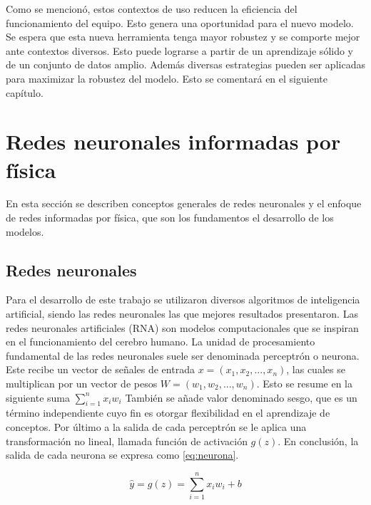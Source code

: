 Como se mencionó, estos contextos de uso reducen la eficiencia del funcionamiento del equipo. Esto genera una oportunidad para el nuevo modelo. Se espera que esta nueva herramienta tenga mayor robustez y se comporte mejor ante contextos diversos. Esto puede lograrse a partir de un aprendizaje sólido y de un conjunto de datos amplio. Además diversas estrategias pueden ser aplicadas para maximizar la robustez del modelo. Esto se comentará en el siguiente capítulo.

\section{Redes neuronales informadas por física}
En esta sección se describen conceptos generales de redes neuronales y el enfoque de redes informadas por física, que son los fundamentos el desarrollo de los modelos.

\newenvironment{conditions}
{\par\vspace{\abovedisplayskip}\noindent\begin{tabular}{>{$}l<{$} @{${}={}$} l}}
	{\end{tabular}\par\vspace{\belowdisplayskip}}

\subsection{Redes neuronales}
Para el desarrollo de este trabajo se utilizaron diversos algoritmos de inteligencia artificial, siendo las redes neuronales las que mejores resultados presentaron. 
Las redes neuronales artificiales (RNA) son modelos computacionales que se inspiran en el funcionamiento del cerebro humano. La unidad de procesamiento fundamental de las redes neuronales suele ser denominada perceptrón o neurona.  Este recibe un vector de señales de entrada $ x =(x_1, x_2, . . . , x_n) $, las cuales se multiplican por un vector de pesos $W = (w_1, w_2, . . . , w_n)$. Esto se resume en la siguiente suma $\sum_{i=1}^n x_i  w_i$
También se añade valor denominado sesgo, que es un término independiente cuyo fin es otorgar flexibilidad en el aprendizaje de conceptos.
Por último a la salida de cada perceptrón se le aplica una transformación no lineal, llamada función de activación $g(z)$.  En conclusión, la salida de cada neurona se expresa como \ref{eq:neurona}.

\begin{equation}
	\label{eq:neurona}
	\hat{y} = g(z) = \sum_{i=1}^n x_i  w_i + b
\end{equation}

